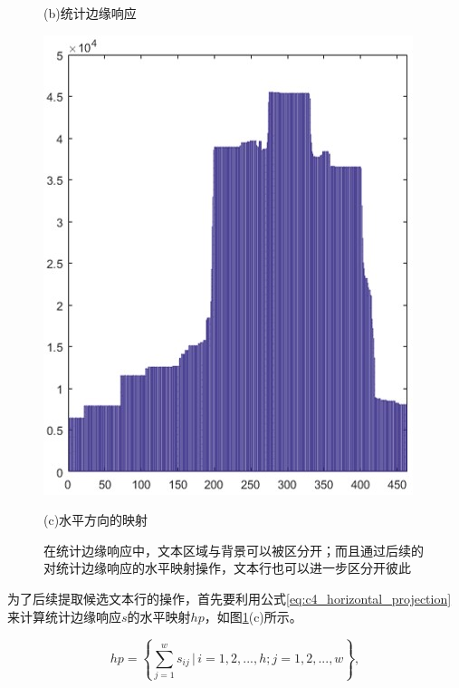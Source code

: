 \begin{figure}[htbp]
\begin{minipage}[t]{0.35\linewidth}
        \centerline{\small (b)统计边缘响应}
        \end{minipage}
        \begin{minipage}[t]{0.25\linewidth}
        \centering
        \includegraphics[width=\textwidth]{./figures/c4_horizontal_projection.jpg}
        \centerline{\small (c)水平方向的映射}
        \end{minipage}
        \caption{在统计边缘响应中，文本区域与背景可以被区分开；而且通过后续的对统计边缘响应的水平映射操作，文本行也可以进一步区分开彼此}
        \label{fig.c4_static_skeleton_response}
        \end{figure}
        
        为了后续提取候选文本行的操作，首先要利用公式\ref{eq:c4_horizontal_projection} 来计算统计边缘响应$s$的水平映射$hp$，如图\ref{fig.c4_static_skeleton_response}(c)所示。

        \begin{equation}
        hp= \left\{ \sum_{j=1}^w s_{ij} \, | \, i=1,2,...,h;j=1,2,...,w \right\},
        \label{eq:c4_horizontal_projection}
        \end{equation}
        
